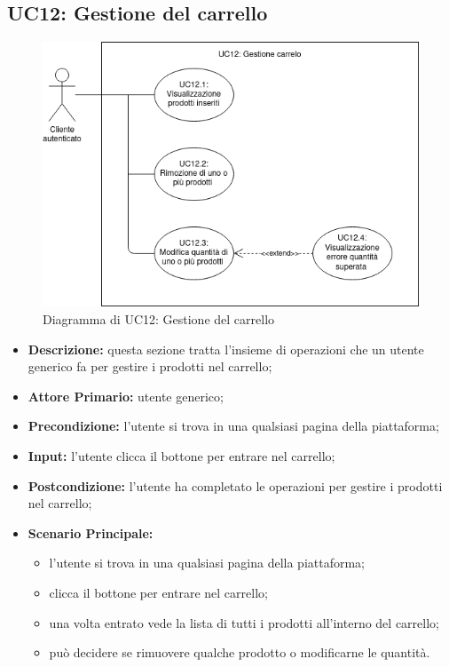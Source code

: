 \subsection{UC12: Gestione del carrello}
\label{sec:UC12}
\begin{figure}[!ht]
    \caption{Diagramma di UC12: Gestione del carrello}
    \vspace{10px}
    \includegraphics[scale=0.5]{../../../Images/AnalisiRequisiti/UC12}
    \centering
\end{figure}
\begin{itemize}
    \item \textbf{Descrizione:} questa sezione tratta l'insieme di operazioni che un utente generico fa per gestire i prodotti nel carrello;
    \item \textbf{Attore Primario:} utente generico;
    \item \textbf{Precondizione:} l'utente si trova in una qualsiasi pagina della piattaforma;
    \item \textbf{Input:} l'utente clicca il bottone per entrare nel carrello;
    \item \textbf{Postcondizione:} l'utente ha completato le operazioni per gestire i prodotti nel carrello;
    \item \textbf{Scenario Principale:}
          \begin{itemize}
              \item l'utente si trova in una qualsiasi pagina della piattaforma;
              \item clicca il bottone per entrare nel carrello;
              \item una volta entrato vede la lista di tutti i prodotti all'interno del carrello;
              \item può decidere se rimuovere qualche prodotto o modificarne le quantità.
          \end{itemize}
\end{itemize}
